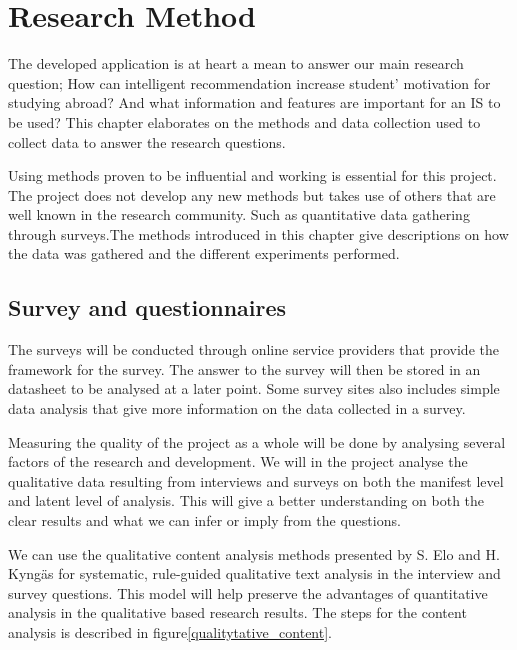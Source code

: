 
\chapter{Research Method}\label{chap:3}

\iffalse
The developed application is at heart a mean to answer our main research question; How can intelligent recommendation increase student' motivation for studying abroad? And what information and features are important for an IS to be used? This chapter elaborates on the methods and data collection used to collect data to answer the research questions.

Using methods proven to be influential and working is essential for this project. The project does not develop any new methods but takes use of others that are well known in the research community. Such as quantitative data gathering through surveys.The methods introduced in this chapter give descriptions on how the data was gathered and the different experiments performed.

\section{Survey and questionnaires}

The surveys will be conducted through online service providers that provide the framework for the survey. The answer to the survey will then be stored in an datasheet to be analysed at a later point. Some survey sites also includes simple data analysis that give more information on the data collected in a survey.

Measuring the quality of the project as a whole will be done by analysing several factors of the research and development. We will in the project analyse the qualitative data resulting from interviews and surveys on both the manifest level and latent level of analysis. This will give a better understanding on both the clear results and what we can infer or imply from the questions.

We can use the qualitative content analysis methods presented by S. Elo and H. Kyngäs\cite{elo2008qualitative} for systematic, rule-guided qualitative text analysis in the interview and survey questions. This model will help preserve the advantages of quantitative analysis in the qualitative based research results. The steps for the content analysis is described in figure\ref{qualitytative_content}. 

